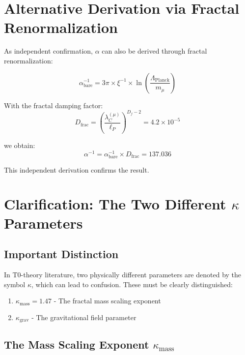 \documentclass[12pt,a4paper]{article}
\begin{document}
	\section{Alternative Derivation via Fractal Renormalization}
	
	As independent confirmation, $\alpha$ can also be derived through fractal renormalization:
	
	\begin{equation}
		\alpha_{\text{bare}}^{-1} = 3\pi \times \xi^{-1} \times \ln\left(\frac{\Lambda_{\text{Planck}}}{m_\mu}\right)
	\end{equation}
	
	With the fractal damping factor:
	\begin{equation}
		D_{\text{frac}} = \left(\frac{\lambda_C^{(\mu)}}{\ell_P}\right)^{D_f-2} = 4.2 \times 10^{-5}
	\end{equation}
	
	we obtain:
	\begin{equation}
		\alpha^{-1} = \alpha_{\text{bare}}^{-1} \times D_{\text{frac}} = 137.036
	\end{equation}
	
	This independent derivation confirms the result.
	
	\section{Clarification: The Two Different $\kappa$ Parameters}
	
	\subsection{Important Distinction}
	
	In T0-theory literature, two physically different parameters are denoted by the symbol $\kappa$, which can lead to confusion. These must be clearly distinguished:
	
	\begin{enumerate}
		\item $\kappa_{\text{mass}} = 1.47$ - The fractal mass scaling exponent
		\item $\kappa_{\text{grav}}$ - The gravitational field parameter
	\end{enumerate}
	
	\subsection{The Mass Scaling Exponent $\kappa_{\text{mass}}$}
	
\end{document}
